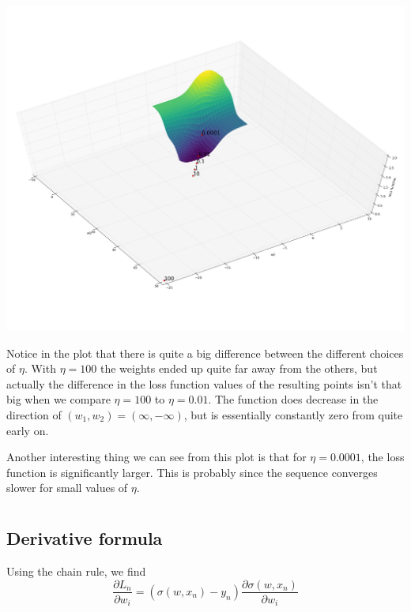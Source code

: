 \documentclass{article}
\begin{document}
\begin{centering}
	\includegraphics[width=\linewidth]{exercise4_task13.png}
\end{centering}

Notice in the plot that there is quite a big difference between the different choices of $\eta$. With $\eta = 100$ the weights ended up quite far away from the others, but actually the difference in the loss function values of the resulting points isn't that big when we compare $\eta = 100$ to $\eta = 0.01$. 
The function does decrease in the direction of $(w_1,w_2) = (\infty,-\infty)$, but is essentially constantly zero from quite early on. 

Another interesting thing we can see from this plot is that for $\eta=0.0001$, the loss function is significantly larger. This is probably since the sequence converges slower for small values of $\eta$. 

\section{}
\subsection{Derivative formula}
Using the chain rule, we find
\begin{equation} 
	\frac{\partial L_n}{\partial w_i} = (\sigma(w,x_n) - y_n) \frac{\partial \sigma(w,x_n)}{\partial w_i} \label{eq:partial_L_halway}
\end{equation}
\end{document}
